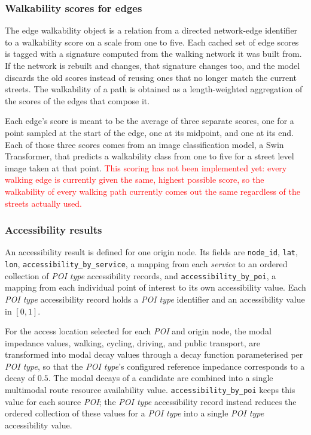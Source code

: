 \documentclass{article}
\newcommand{\notimpl}[1]{\textcolor{red}{#1}}
\begin{document}
\subsubsection*{Walkability scores for edges}
    The edge walkability object is a relation from a directed network-edge
    identifier to a walkability score on a scale from one to five. Each cached
    set of edge scores is tagged with a signature computed from the walking
    network it was built from. If the network is rebuilt and changes, that
    signature changes too, and the model discards the old scores instead of
    reusing ones that no longer match the current streets. The walkability of
    a path is obtained as a length-weighted aggregation of the scores of the
    edges that compose it.

    Each edge's score is meant to be the average of three separate scores,
    one for a point sampled at the start of the edge, one at its midpoint,
    and one at its end. Each of those three scores comes from an image
    classification model, a Swin Transformer, that predicts a walkability
    class from one to five for a street level image taken at that point.
    \notimpl{This scoring has not been implemented yet: every walking edge is
    currently given the same, highest possible score, so the walkability of
    every walking path currently comes out the same regardless of the streets
    actually used.}

\subsubsection*{Accessibility results}
    An accessibility result is defined for one origin node. Its fields are
    \texttt{node\_id}, \texttt{lat}, \texttt{lon}, \texttt{accessibility\_\allowbreak by\_\allowbreak service},
    a mapping from each \emph{service} to an ordered collection of \emph{POI type}
    accessibility records, and \texttt{accessibility\_\allowbreak by\_\allowbreak poi}, a mapping from each
    individual point of interest to its own accessibility value. Each \emph{POI type}
    accessibility record holds a \emph{POI type} identifier and an accessibility
    value in $[0,1]$.

    For the access location selected for each \emph{POI} and origin node, the modal
    impedance values, walking, cycling, driving, and public transport, are
    transformed into modal decay values through a decay function parameterised per
    \emph{POI type}, so that the \emph{POI type}'s configured reference impedance
    corresponds to a decay of $0.5$. The modal decays of a candidate are combined
    into a single multimodal route resource availability value.
    \texttt{accessibility\_by\_poi} keeps this value for each source \emph{POI};
    the \emph{POI type} accessibility record instead reduces the ordered collection
    of these values for a \emph{POI type} into a single \emph{POI type}
    accessibility value.
\end{document}
